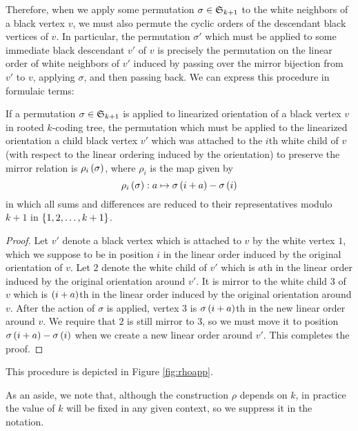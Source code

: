 \documentclass[sectionflow,singlespace,twoside,boldmathhdr,draft]{brandiss} %
\numberwithin{section}{chapter}
\numberwithin{figure}{chapter}
\begin{document}
Therefore, when we apply some permutation $\sigma \in  \mathfrak{S}_{k+1} $ to the white neighbors of a black vertex $v$, we must also permute the cyclic orders of the descendant black vertices of $v$.
In particular, the permutation $\sigma'$ which must be applied to some immediate black descendant $v'$ of $v$ is precisely the permutation on the linear order of white neighbors of $v'$ induced by passing over the mirror bijection from $v'$ to $v$, applying $\sigma$, and then passing back.
We can express this procedure in formulaic terms:
\begin{theorem}
  \label{thm:rhodef}
  If a permutation $\sigma \in  \mathfrak{S}_{k+1} $ is applied to linearized orientation of a black vertex $v$ in rooted $k$-coding tree, the permutation which must be applied to the linearized orientation a child black vertex $v'$ which was attached to the $i$th white child of $v$ (with respect to the linear ordering induced by the orientation) to preserve the mirror relation is $\rho_{i} \left( {\sigma} \right)$, where $\rho_{i}$ is the map given by
  \begin{equation}
    \label{eq:rhodef}
    \rho_{i} \left( {\sigma} \right): a \mapsto \sigma \left( {i + a} \right) - \sigma \left( {i} \right)
  \end{equation}
  in which all sums and differences are reduced to their representatives modulo $k+1$ in $\left\{ {1, 2, \dots, k+1} \right\}$.
\end{theorem}
\begin{proof}
  Let $v'$ denote a black vertex which is attached to $v$ by the white vertex $1$, which we suppose to be in position $i$ in the linear order induced by the original orientation of $v$.
  Let $2$ denote the white child of $v'$ which is $a$th in the linear order induced by the original orientation around $v'$.
  It is mirror to the white child $3$ of $v$ which is $\left( {i+a} \right)$th in the linear order induced by the original orientation around $v$.
  After the action of $\sigma$ is applied, vertex $3$ is $\sigma \left( {i+a} \right)$th in the new linear order around $v$.
  We require that $2$ is still mirror to $3$, so we must move it to position $\sigma \left( {i + a} \right) - \sigma \left( {i} \right)$ when we create a new linear order around $v'$.
  This completes the proof.
\end{proof}
This procedure is depicted in Figure \ref{fig:rhoapp}.

As an aside, we note that, although the construction $\rho$ depends on $k$, in practice the value of $k$ will be fixed in any given context, so we suppress it in the notation.
\end{document}
